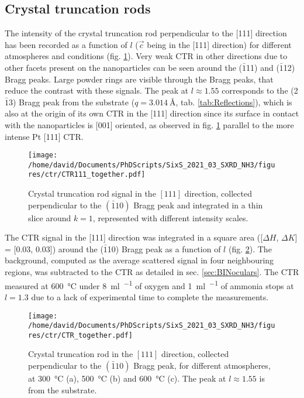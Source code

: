 \subsection{Crystal truncation rods}

The intensity of the crystal truncation rod perpendicular to the [111] direction has been recorded as a function of $l$ ($\vec{c}$ being in the [111] direction) for different atmospheres and conditions (fig. \ref{fig:2DCTR111Particles}).
Very weak CTR in other directions due to other facets present on the nanoparticles can be seen around the ($\bar{1}$11) and ($\bar{1}$12) Bragg peaks.
Large powder rings are visible through the Bragg peaks, that reduce the contrast with these signals.
The peak at $l\approx1.55$ corresponds to the (2$\bar{1}$3) Bragg peak from the  substrate ($q = \qty{3.014}{\angstrom}$, tab. \ref{tab:Reflections}), which is also at the origin of its own CTR in the [111] direction since its surface in contact with the nanoparticles is [001] oriented, as observed in fig. \ref{fig:2DCTR111Particles} parallel to the more intense Pt [111] CTR.

\begin{figure}[!htb]
    \centering
    \texttt{[image: /home/david/Documents/PhDScripts/SixS\_2021\_03\_SXRD\_NH3/figures/ctr/CTR111\_together.pdf]}
    \caption{
        Crystal truncation rod signal in the $[111]$ direction, collected perpendicular to the $(\bar{1}10)$ Bragg peak and integrated in a thin slice around $k=1$, represented with different intensity scales.
    }
    \label{fig:2DCTR111Particles}
\end{figure}

The CTR signal in the [111] direction was integrated in a square area ([$\Delta H$, $\Delta K$] = [0.03, 0.03]) around the ($\bar{1}$10) Bragg peak as a function of $l$ (fig. \ref{fig:CTR111Particles}).
The background, computed as the average scattered signal in four neighbouring regions, was subtracted to the CTR as detailed in sec. \ref{sec:BINoculars}.
The CTR measured at \qty{600}{\degreeCelsius} under \qty{8}{\ml\per\min} of oxygen and \qty{1}{\ml\per\min} of ammonia stops at $l=1.3$ due to a lack of experimental time to complete the measurements.

\begin{figure}[!htb]
    \centering
    \texttt{[image: /home/david/Documents/PhDScripts/SixS\_2021\_03\_SXRD\_NH3/figures/ctr/CTR\_together.pdf]}
    \caption{
        Crystal truncation rod in the $[111]$ direction, collected perpendicular to the $(\bar{1}10)$ Bragg peak, for different atmospheres, at \qty{300}{\degreeCelsius} (a), \qty{500}{\degreeCelsius} (b) and \qty{600}{\degreeCelsius} (c).
        The peak at $l\approx1.55$ is from the  substrate.
    }
    \label{fig:CTR111Particles}
\end{figure}

